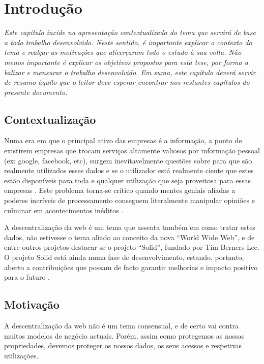 \chapter{Introdução}
\label{cap:1}
\emph{Este capítulo incide na apresentação contextualizada do tema que servirá de base a todo trabalho desenvolvido. Neste sentido, é importante explicar o contexto do tema e realçar as motivações que alicerçaram todo o estudo à sua volta. Não menos importante é explicar os objetivos propostos para esta tese, por forma a balizar e mensurar o trabalho desenvolvido.
Em suma, este capítulo deverá servir de resumo àquilo que o leitor deve esperar encontrar nos restantes capítulos do presente documento.}


\section{Contextualização}
Numa era em que o principal ativo das empresas é a informação, a ponto de existirem empresas que trocam serviços altamente valiosos por informação pessoal (ex: google, facebook, etc)\cite{top_three_issues_centralized_web}, surgem inevitavelmente questões sobre para que são realmente utilizados esses dados e se o utilizador está realmente ciente que estes estão disponíveis para toda e qualquer utilização que seja proveitosa para essas empresas \cite{facebook_data_hell_medium}. Este problema torna-se crítico quando mentes geniais aliadas a poderes incríveis de processamento conseguem literalmente manipular opiniões e culminar em acontecimentos inéditos \cite{cambridge_analytica}.

A descentralização da web é um tema que assenta também em como tratar estes dados, não estivesse o tema aliado ao conceito da nova “World Wide Web”, e de entre outros projetos destacar-se o projeto “Solid”, fundado por Tim Berners-Lee. O projeto Solid está ainda numa fase de desenvolvimento, estando, portanto, aberto a contribuições que possam de facto garantir melhorias e impacto positivo para o futuro \cite{why_web_decentralization_future}.

\section{Motivação}
A descentralização da web não é um tema consensual, e de certo vai contra muitos modelos de negócio actuais. Porém, assim como protegemos as nossas propriedades, devemos proteger os nossos dados, os seus acessos e respetivas utilizações.

